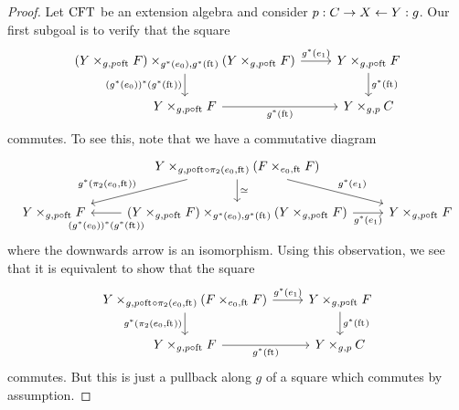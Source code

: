 \begin{proof}
Let $\mathrm{CFT}$ be an extension algebra and consider $p:C\rightarrow X\leftarrow Y:g$.
Our first subgoal is to verify that the square
\begin{equation*}
\begin{tikzcd}
\pullback%
  {\pullback{Y}{\stesysf}{g}{p\circ\eft}}%
  {\pullback{Y}{\stesysf}{g}{p\circ\eft}}%
  {g^\ast(\ectxext)}%
  {g^\ast(\eft)}
  \ar{r}{g^\ast(\efamext)} 
  \ar{d}[swap]{(g^\ast(\ectxext))^\ast(g^\ast(\eft))} 
  & 
\pullback{Y}{\stesysf}{g}{p\circ\eft}
  \ar{d}{g^\ast(\eft)}
  \\
\pullback{Y}{\stesysf}{g}{p\circ\eft}
  \ar{r}[swap]{g^\ast(\eft)} 
  & 
\pullback{Y}{\stesysc}{g}{p}
\end{tikzcd}
\end{equation*}
commutes. To see this, note that we have a commutative diagram
\begin{equation*}
\begin{tikzcd}
{}&
  \pullback%
  {Y}
  {\pullback{\stesysf}{\stesysf}{\ectxext}{\eft}}
  {g}
  {p\circ\eft\circ\pullbackpr{2}{\ectxext}{\eft}}
  \ar{dl}[swap]{g^\ast(\pullbackpr{2}{\ectxext}{\eft})}
  \ar{dr}{g^\ast(\efamext)}
  \ar{d}{\simeq}
  \\
\pullback{Y}{\stesysf}{g}{p\circ\eft}
  &
\pullback%
  {\pullback{Y}{\stesysf}{g}{p\circ\eft}}
  {\pullback{Y}{\stesysf}{g}{p\circ\eft}}
  {g^\ast(\ectxext)}
  {g^\ast(\eft)}
  \ar{r}[swap]{g^\ast(\efamext)}
  \ar{l}[yshift=-1ex]{(g^\ast(\ectxext))^\ast(g^\ast(\eft))}
  &
\pullback{Y}{\stesysf}{g}{p\circ\eft}
\end{tikzcd}
\end{equation*}
where the downwards arrow is an isomorphism. Using this observation, we see that
it is equivalent to show that the square
\begin{equation*}
\begin{tikzcd}
\pullback%
  {Y}
  {\pullback{\stesysf}{\stesysf}{\ectxext}{\eft}}
  {g}
  {p\circ\eft\circ\pullbackpr{2}{\ectxext}{\eft}}
  \ar{r}{g^\ast(\efamext)} 
  \ar{d}[swap]{g^\ast(\pullbackpr{2}{\ectxext}{\eft})} 
  & 
\pullback{Y}{\stesysf}{g}{p\circ\eft}
  \ar{d}{g^\ast(\eft)}
  \\
\pullback{Y}{\stesysf}{g}{p\circ\eft}
  \ar{r}[swap]{g^\ast(\eft)} 
  & 
\pullback{Y}{\stesysc}{g}{p}
\end{tikzcd}
\end{equation*}
commutes. But this is just a pullback along $g$ of a square which commutes by assumption.
\begin{comment}

\end{comment}
\end{proof}
